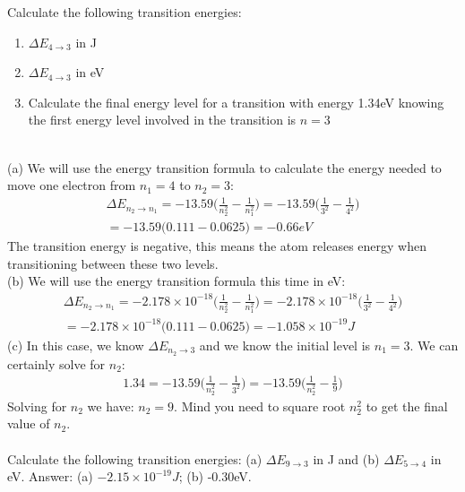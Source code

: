 \documentclass[main.tex]{subfiles}
\begin{document}
\begin{description}
\begin{example} %
Calculate the following transition energies:
\begin{enumerate}[label=(\alph*)]
\item $\Delta E_{4\rightarrow 3}$ in J
\item $\Delta E_{4\rightarrow 3}$  in eV
\item Calculate the final energy level for a transition with energy 1.34eV knowing the first energy level involved in the transition is $n=3$
\end{enumerate}
\\
(a) We will use the energy transition formula to calculate the energy needed to move one electron from $n_1=4$ to $n_2=3$:
\begin{equation*}\begin{split}
\Delta E_{n_2\rightarrow n_1}=-13.59 \Bigg( \frac{1}{n_2^2}-\frac{1}{n_1^2}\Bigg)  =-13.59\Bigg( \frac{1}{3^2}-\frac{1}{4^2}\Bigg)\\
=-13.59\Bigg( 0.111- 0.0625 \Bigg)=-0.66eV
\end{split}\end{equation*}
The transition energy is negative, this means the atom releases energy when transitioning between these two levels.\\
(b) We will use the energy transition formula this time in eV:
\begin{equation*}\begin{split}
\Delta E_{n_2\rightarrow n_1}=-2.178\times 10^{-18} \Bigg( \frac{1}{n_2^2}-\frac{1}{n_1^2}\Bigg)  =-2.178\times 10^{-18}\Bigg( \frac{1}{3^2}-\frac{1}{4^2}\Bigg)\\
=-2.178\times 10^{-18}\Bigg( 0.111- 0.0625 \Bigg)=-1.058\times 10^{-19}J
\end{split}\end{equation*}
(c) In this case, we know $\Delta E_{n_2\rightarrow 3}$ and we know the initial level is $n_1=3$. We can certainly solve for $n_2$:
\begin{equation*}\begin{split}
1.34=-13.59 \Bigg( \frac{1}{n_2^2}-\frac{1}{3^2}\Bigg)  =-13.59\Bigg( \frac{1}{n_2^2}-\frac{1}{9}\Bigg)
\end{split}\end{equation*}
Solving for $n_2$ we have: $n_2=9$. Mind you need to square root $n_2^2$ to get the final value of $n_2$.\\
\faDiamond\ \\
Calculate the following transition energies:
(a) $\Delta E_{9\rightarrow 3}$ in J and (b) $\Delta E_{5\rightarrow 4}$  in eV.
\flushright Answer: (a) $-2.15\times 10^{-19}J$; (b) -0.30eV.
\end{example}%
\end{description}
\end{document}
